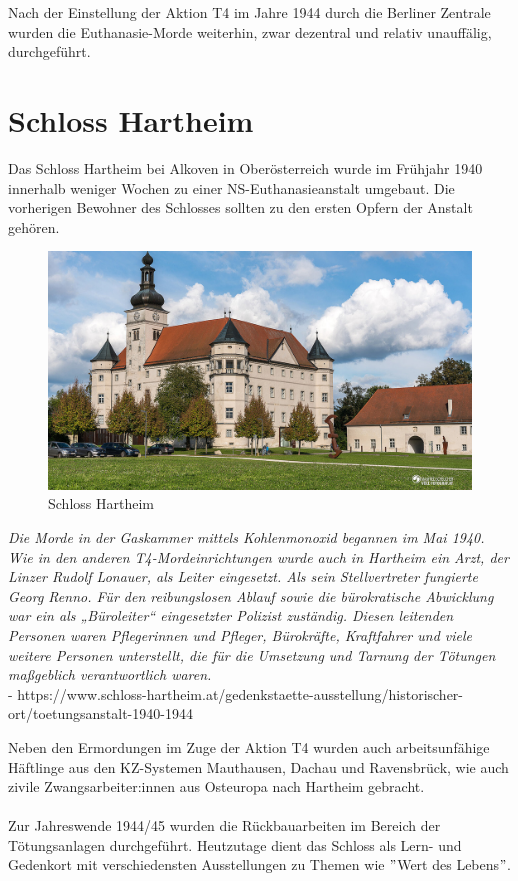 \documentclass[a4paper, ngerman]{article}
\begin{document}
\noindent Nach der Einstellung der Aktion T4 im Jahre 1944 durch die Berliner Zentrale wurden die Euthanasie-Morde weiterhin, zwar
dezentral und relativ unauffälig, durchgeführt.

\section*{Schloss Hartheim}

Das Schloss Hartheim bei Alkoven in Oberösterreich wurde im Frühjahr 1940 innerhalb weniger Wochen zu einer NS-Euthanasieanstalt
umgebaut. Die vorherigen Bewohner des Schlosses sollten zu den ersten Opfern der Anstalt gehören.

\begin{figure}[h]
    \centering
    \includegraphics[scale=0.2]{hartheim.jpg}
    \caption{Schloss Hartheim}
\end{figure}

\begin{center}
    \textit{Die Morde in der Gaskammer mittels Kohlenmonoxid begannen im Mai 1940. Wie in den anderen T4-Mordeinrichtungen wurde auch in Hartheim ein Arzt, der Linzer Rudolf Lonauer, als Leiter eingesetzt. Als sein Stellvertreter fungierte Georg Renno. Für den reibungslosen Ablauf sowie die bürokratische Abwicklung war ein als „Büroleiter“ eingesetzter Polizist zuständig. Diesen leitenden Personen waren Pflegerinnen und Pfleger, Bürokräfte, Kraftfahrer und viele weitere Personen unterstellt, die für die Umsetzung und Tarnung der Tötungen maßgeblich verantwortlich waren.
    }
    \\ - https://www.schloss-hartheim.at/gedenkstaette-ausstellung/historischer-ort/toetungsanstalt-1940-1944
\end{center}

\noindent Neben den Ermordungen im Zuge der Aktion T4 wurden auch arbeitsunfähige Häftlinge aus den KZ-Systemen
Mauthausen, Dachau und Ravensbrück, wie auch zivile Zwangsarbeiter:innen aus Osteuropa nach Hartheim gebracht.
\\ \\
Zur Jahreswende 1944/45 wurden die Rückbauarbeiten im Bereich der Tötungsanlagen durchgeführt. Heutzutage dient
das Schloss als Lern- und Gedenkort mit verschiedensten Ausstellungen zu Themen wie $"$Wert des Lebens$"$.
\end{document}
